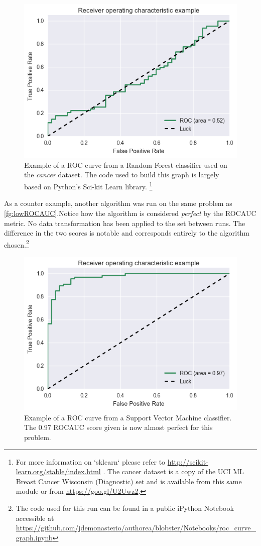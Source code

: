 \begin{figure}[h!]
\begin{center}
\includegraphics[width=0.7\columnwidth]{figures/figure-lowROCAUC/figure-lowROCAUC_original}
\caption{Example of a ROC curve from a Random Forest classifier used on the \textit{cancer} dataset. The code used to build this graph is largely based on Python's Sci-kit Learn library. \protect\footnote{For more information on `sklearn` please refer to \url{http://scikit-learn.org/stable/index.html} \protect\textcite{scikit-learn} . The cancer dataset is a copy of the UCI ML Breast Cancer Wisconsin (Diagnostic) set and is available from this same module or from \url{https://goo.gl/U2Uwz2}.} }
\end{center}
\end{figure}\label{fg:lowROCAUC}
%

As a counter example, another algorithm was run on the same problem as \cref{fg:lowROCAUC}.Notice how the algorithm is considered \textit{perfect} by the ROCAUC metric. No data transformation has been applied to the set between runs. The difference in the two scores is notable and corresponds entirely to the algorithm chosen.\footnote{The code used for this run can be found in a public iPython Notebook accessible at \url{https://github.com/jdemonasterio/authorea/blobster/Notebooks/roc_curve_graph.ipynb}}

\begin{figure}[h!]
\begin{center}
\includegraphics[width=0.7\columnwidth]{figures/figure-highROCAUC/figure-highROCAUC}
\caption{Example of a ROC curve from a Support Vector Machine classifier. The $0.97$ ROCAUC score given is now almost perfect for this problem.%
}
\end{center}
\end{figure}

